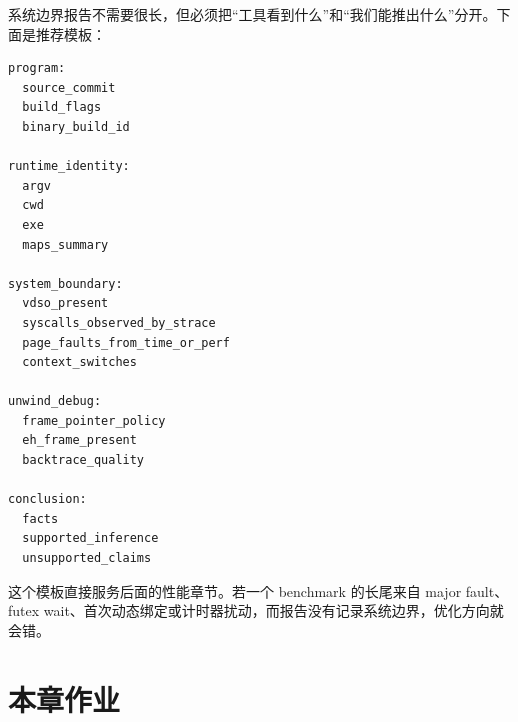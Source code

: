 系统边界报告不需要很长，但必须把“工具看到什么”和“我们能推出什么”分开。下面是推荐模板：

\begin{lstlisting}[numbers=none,caption={系统边界报告模板}]
program:
  source_commit
  build_flags
  binary_build_id

runtime_identity:
  argv
  cwd
  exe
  maps_summary

system_boundary:
  vdso_present
  syscalls_observed_by_strace
  page_faults_from_time_or_perf
  context_switches

unwind_debug:
  frame_pointer_policy
  eh_frame_present
  backtrace_quality

conclusion:
  facts
  supported_inference
  unsupported_claims
\end{lstlisting}

这个模板直接服务后面的性能章节。若一个 benchmark 的长尾来自 major fault、futex wait、首次动态绑定或计时器扰动，而报告没有记录系统边界，优化方向就会错。

\section{本章作业}

